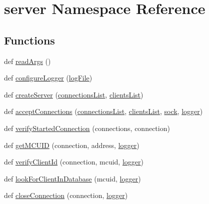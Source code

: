 \hypertarget{namespaceserver}{}\section{server Namespace Reference}
\label{namespaceserver}
\subsection*{Functions}
\begin{DoxyCompactItemize}
\item 
def \hyperlink{namespaceserver_aa317dc86338d02253076787cc8e5d997}{read\+Args} ()
\item 
def \hyperlink{namespaceserver_a44a7428717edc164d7dd564478da2da3}{configure\+Logger} (\hyperlink{namespaceserver_ab968a55cbe8af171a0fcbae9a876cab4}{log\+File})
\item 
def \hyperlink{namespaceserver_a240f07b12d57cfa5cff5612501fe7dc8}{create\+Server} (\hyperlink{namespaceserver_a734e47a5cf907dc2e128358488a9c3e7}{connections\+List}, \hyperlink{namespaceserver_acc42864cdf2e6dd395c42dd780cbde1d}{clients\+List})
\item 
def \hyperlink{namespaceserver_ac1ec62c626a3425033381ef5718ce12b}{accept\+Connections} (\hyperlink{namespaceserver_a734e47a5cf907dc2e128358488a9c3e7}{connections\+List}, \hyperlink{namespaceserver_acc42864cdf2e6dd395c42dd780cbde1d}{clients\+List}, \hyperlink{namespaceserver_a995df52292d049e26620aefae8eb4e1d}{sock}, \hyperlink{namespaceserver_abfa1d56012bc320e4b26361390f6fc24}{logger})
\item 
def \hyperlink{namespaceserver_a4e6504daf55d2ef34d4d2ea5b30074f3}{verify\+Started\+Connection} (connections, connection)
\item 
def \hyperlink{namespaceserver_a26f3a1d49ee9e013ed77fbcb273a99be}{get\+M\+C\+U\+ID} (connection, address, \hyperlink{namespaceserver_abfa1d56012bc320e4b26361390f6fc24}{logger})
\item 
def \hyperlink{namespaceserver_a4c51be10ba9f982375f4c0a426078a96}{verify\+Client\+Id} (connection, mcuid, \hyperlink{namespaceserver_abfa1d56012bc320e4b26361390f6fc24}{logger})
\item 
def \hyperlink{namespaceserver_a998e5671e2ab0c79b9abe44e87e203a0}{look\+For\+Client\+In\+Database} (mcuid, \hyperlink{namespaceserver_abfa1d56012bc320e4b26361390f6fc24}{logger})
\item 
def \hyperlink{namespaceserver_a2e99d18201fed087163454b021b7c007}{close\+Connection} (connection, \hyperlink{namespaceserver_abfa1d56012bc320e4b26361390f6fc24}{logger})

\end{DoxyCompactItemize}
